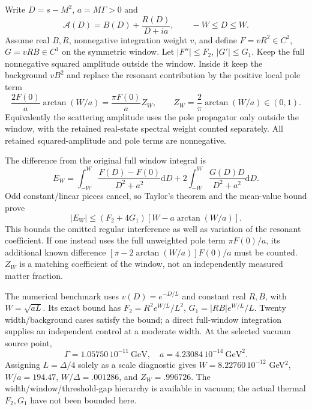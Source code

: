 \documentclass[11pt]{article}
\newcommand{\dd}{\mathrm d}
\begin{document}
Write $D=s-M^2$, $a=M\Gamma>0$ and
\begin{equation}
 \mathcal A(D)=B(D)+\frac{R(D)}{D+ia},\qquad -W\le D\le W.
\end{equation}
Assume real $B,R$, nonnegative integration weight $v$, and define
$F=vR^2\in C^2$, $G=vRB\in C^1$ on the symmetric window. Let
$|F''|\le F_2$, $|G'|\le G_1$. Keep the full nonnegative squared
amplitude outside the window. Inside it keep the background $vB^2$ and
replace the resonant contribution by the positive local pole term
\begin{equation}
 \frac{2F(0)}a\arctan(W/a)
 =\frac{\pi F(0)}a Z_W,\qquad
 Z_W=\frac2\pi\arctan(W/a)\in(0,1).
\end{equation}
Equivalently the scattering amplitude uses the pole propagator only
outside the window, with the retained real-state spectral weight counted
separately. All retained squared-amplitude and pole terms are nonnegative.

The difference from the original full window integral is
\begin{equation}
 E_W=\int_{-W}^W\frac{F(D)-F(0)}{D^2+a^2}\dd D
 +2\int_{-W}^W\frac{G(D)D}{D^2+a^2}\dd D.
\end{equation}
Odd constant/linear pieces cancel, so Taylor's theorem and the mean-value
bound prove
\begin{equation}
 \boxed{|E_W|\le(F_2+4G_1)[W-a\arctan(W/a)].}
\end{equation}
This bounds the omitted regular interference as well as variation of the
resonant coefficient. If one instead uses the full unweighted pole term
$\pi F(0)/a$, its additional known difference
$[\pi-2\arctan(W/a)]F(0)/a$ must be counted. $Z_W$ is a matching
coefficient of the window, not an independently measured matter fraction.

The numerical benchmark uses $v(D)=e^{-D/L}$ and constant real $R,B$,
with $W=\sqrt{aL}$. Its exact bound has
$F_2=R^2 e^{W/L}/L^2$, $G_1=|RB|e^{W/L}/L$.
Twenty width/background cases satisfy the bound; a direct full-window
integration supplies an independent control at a moderate width.
At the selected vacuum source point,
\begin{equation}
 \Gamma=1.05750\,10^{-11}\ \mathrm{GeV},\quad
 a=4.23084\,10^{-14}\ \mathrm{GeV}^2.
\end{equation}
Assigning $L=\Delta/4$ solely as a scale diagnostic gives
$W=8.22760\,10^{-12}$ GeV$^2$,
$W/a=194.47$, $W/\Delta=.001286$, and $Z_W=.996726$.
The width/window/threshold-gap hierarchy is available in vacuum; the
actual thermal $F_2,G_1$ have not been bounded here.
\end{document}
